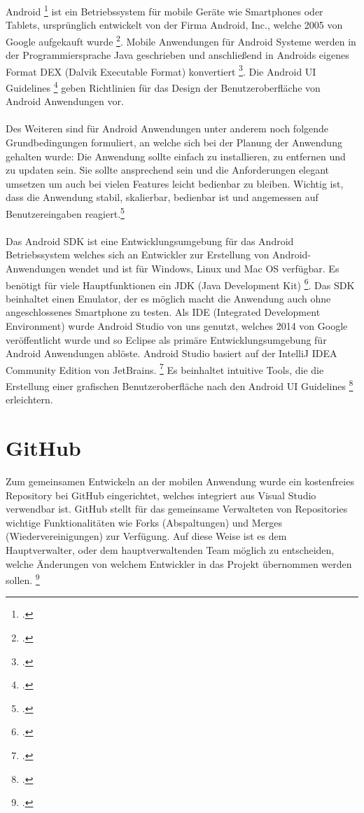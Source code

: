 Android \footcite{Android} ist ein Betriebssystem für mobile Geräte wie Smartphones oder Tablets, ursprünglich entwickelt von der Firma Android, Inc., welche 2005 von Google aufgekauft wurde \footcite{AndroidHistory}. Mobile Anwendungen für Android Systeme werden in der Programmiersprache Java geschrieben und anschließend in Androids eigenes Format DEX (Dalvik Executable Format) konvertiert \footcite{AndroidCookbook}. Die Android UI Guidelines \footcite{AndroidGuidelines} geben Richtlinien für das Design der Benutzeroberfläche von Android Anwendungen vor.
\\
\\
Des Weiteren sind für Android Anwendungen unter anderem noch folgende Grundbedingungen formuliert, an welche sich bei der Planung der Anwendung gehalten wurde: Die Anwendung sollte einfach zu installieren, zu entfernen und zu updaten sein. Sie sollte ansprechend sein und die Anforderungen elegant umsetzen um auch bei vielen Features leicht bedienbar zu bleiben. Wichtig ist, dass die Anwendung stabil, skalierbar, bedienbar ist und angemessen auf Benutzereingaben reagiert.\footcite{AndroidCookbook}
\\
\\
Das Android SDK ist eine Entwicklungsumgebung für das Android Betriebssystem welches sich an Entwickler zur Erstellung von Android-Anwendungen wendet und ist für Windows, Linux und Mac OS verfügbar. Es benötigt für viele Hauptfunktionen ein JDK (Java Development Kit) \footcite{AndroidSDK}. Das SDK beinhaltet einen Emulator, der es möglich macht die Anwendung auch ohne angeschlossenes Smartphone zu testen. Als IDE (Integrated Development Environment) wurde Android Studio von uns genutzt, welches 2014 von Google veröffentlicht wurde und so Eclipse als primäre Entwicklungsumgebung für Android Anwendungen ablöste. Android Studio basiert auf der IntelliJ IDEA Community Edition von JetBrains. \footcite{AndroidOP} Es beinhaltet intuitive Tools, die die Erstellung einer grafischen Benutzeroberfläche nach den Android UI Guidelines \footcite{AndroidGuidelines} erleichtern. 

\section{GitHub}

Zum gemeinsamen Entwickeln an der mobilen Anwendung wurde ein kostenfreies Repository bei GitHub eingerichtet, welches integriert aus Visual Studio verwendbar ist. GitHub stellt für das gemeinsame Verwalteten von Repositories wichtige Funktionalitäten wie Forks (Abspaltungen) und Merges (Wiedervereinigungen) zur Verfügung. Auf diese Weise ist es dem Hauptverwalter, oder dem hauptverwaltenden Team möglich zu entscheiden, welche Änderungen von welchem Entwickler in das Projekt übernommen werden sollen. \footcite{GitHub}

